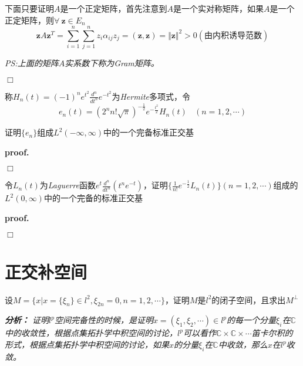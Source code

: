 下面只要证明$A$是一个正定矩阵，首先注意到$A$是一个实对称矩阵，如果$A$是一个正定矩阵，则$\forall\ \mathbf{z}\in E_n$
\begin{equation}
    \mathbf{z}A\mathbf{z}^T=\sum_{i=1}^{n}\sum_{j=1}^{n}z_i\alpha_{ij}z_j=(\mathbf{z},\mathbf{z})=\Vert \mathbf{z}\Vert^2>0(\mbox{由内积诱导范数})
\end{equation}

\textsl{PS:上面的矩阵$A$实系数下称为Gram矩阵。}

$\Box$

\begin{mdframed}
    \begin{question}
        称$H_n(t)=(-1)^ne^{t^2}\frac{d^n}{dt^n}e^{-t^2}$为\textsl{Hermite}多项式，令
        \begin{equation}
            e_n(t)=(2^nn!\sqrt{\pi})^{-\frac{1}{2}}e^{-\frac{t^2}{2}}H_n(t)\ \ \ \ (n=1,2,\cdots)
        \end{equation}

        证明$\{e_n\}$组成$L^2(-\infty,\infty)$中的一个完备标准正交基
    \end{question}
\end{mdframed}

\textbf{proof.}

$\Box$

\begin{mdframed}
    \begin{question}
        令$L_n(t)$为\textsl{Laguerre}函数$e^t\frac{d^n}{dt^n}(t^ne^{-t})$，证明$\{\frac{1}{n!}e^{-\frac{1}{2}}L_n(t)\}(n=1,2,\cdots)$组成的$L^2(0,\infty)$中的一个完备的标准正交基
    \end{question}
\end{mdframed}

\textbf{proof.}

$\Box$

\section{正交补空间}

\begin{mdframed}
    \begin{question}
        设$M=\{x|x=\{\xi_n\}\in l^2,\xi_{2n}=0,n=1,2,\cdots\}$，证明$M$是$l^2$的闭子空间，且求出$M^\perp$
    \end{question}
\end{mdframed}

\textsl{\textbf{分析：} 证明$l^p$空间完备性的时候，是证明$x=(\xi_1,\xi_2,\cdots)\in l^p$的每一个分量$\xi_i$在$\mathbb{C}$中的收敛性，根据点集拓扑学中积空间的讨论，$l^p$可以看作$\mathbb{C}\times \mathbb{C}\times \cdots$笛卡尔积的形式，根据点集拓扑学中积空间的讨论，如果$x$的分量$\xi_i$在$\mathbb{C}$中收敛，那么$x$在$l^p$收敛。} 

